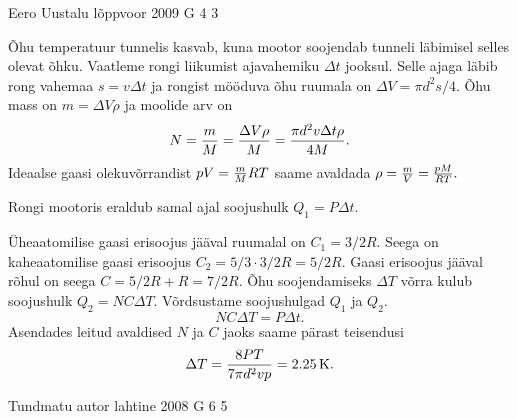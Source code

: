 \documentclass[11pt]{article}
\begin{document}
{%
{Eero Uustalu} %
{lõppvoor} %
{2009} %
{G 4} %
{3} %
{

\ifSolution
Õhu temperatuur tunnelis kasvab, kuna mootor soojendab tunneli läbimisel selles olevat õhku. Vaatleme rongi liikumist ajavahemiku $\Delta t$ jooksul. Selle ajaga läbib rong vahemaa $s = v \Delta t$ ja rongist mööduva õhu ruumala on $\Delta V = \pi d^2 s /4$. Õhu mass on $m = \Delta V \rho$ ja moolide arv on
\[
N = {m \over M}={\Delta V \rho \over M}={\pi d^2 v \Delta t\rho\over 4M}.
\]
Ideaalse gaasi olekuvõrrandist $pV={m\over M}RT$ saame avaldada $\rho={m\over V}={pM\over RT}.$

Rongi mootoris eraldub samal ajal soojushulk $Q_1 = P \Delta t$.

Üheaatomilise gaasi erisoojus jääval ruumalal on $C_1 = 3/2 R$. Seega on kaheaatomilise gaasi erisoojus $C_2 = 5/3 \cdot 3/2R = 5/2 R$. Gaasi erisoojus jääval rõhul on seega $C = 5/2R + R = 7/2 R$. Õhu soojendamiseks $\Delta T$ võrra kulub soojushulk $Q_2 = N C \Delta T$. Võrdsustame soojushulgad $Q_1$ ja $Q_2$.
\[
N C \Delta T = P \Delta t.
\]
Asendades leitud avaldised $N$ ja $C$ jaoks saame pärast teisendusi
\[
\Delta T = {8 P T \over 7\pi d^2 v p } = \SI{2.25}{K}.
\]
\fi
}

{Tundmatu autor} %
{lahtine} %
{2008} %
{G 6} %
{5} %
{

}}
\end{document}
